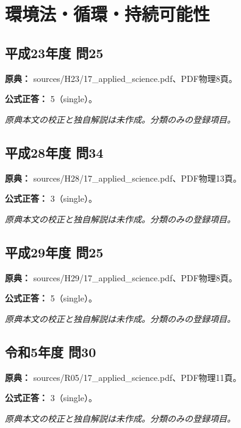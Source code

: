 \section{環境法・循環・持続可能性}

\subsection{平成23年度 問25}
\label{q:h23-reg-applied-25}

\noindent\textbf{原典：} sources/H23/17\_applied\_science.pdf、PDF物理8頁。

\textbf{公式正答：} 5（single）。

\par\textit{原典本文の校正と独自解説は未作成。分類のみの登録項目。}

\subsection{平成28年度 問34}
\label{q:h28-reg-applied-34}

\noindent\textbf{原典：} sources/H28/17\_applied\_science.pdf、PDF物理13頁。

\textbf{公式正答：} 3（single）。

\par\textit{原典本文の校正と独自解説は未作成。分類のみの登録項目。}

\subsection{平成29年度 問25}
\label{q:h29-reg-applied-25}

\noindent\textbf{原典：} sources/H29/17\_applied\_science.pdf、PDF物理8頁。

\textbf{公式正答：} 5（single）。

\par\textit{原典本文の校正と独自解説は未作成。分類のみの登録項目。}

\subsection{令和5年度 問30}
\label{q:r05-reg-applied-30}

\noindent\textbf{原典：} sources/R05/17\_applied\_science.pdf、PDF物理11頁。

\textbf{公式正答：} 3（single）。

\par\textit{原典本文の校正と独自解説は未作成。分類のみの登録項目。}

